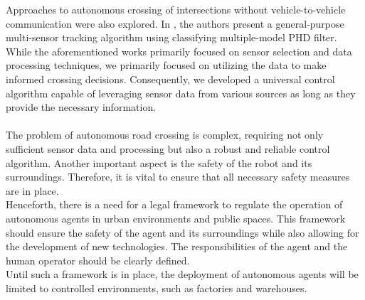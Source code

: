 Approaches to autonomous crossing of intersections without vehicle-to-vehicle communication were also explored. In \cite{CMMPHD}, the authors present a general-purpose multi-sensor tracking algorithm using classifying multiple-model PHD filter.\\
While the aforementioned works primarily focused on sensor selection and data processing techniques, we primarily focused on utilizing the data to make informed crossing decisions. Consequently, we developed a universal control algorithm capable of leveraging sensor data from various sources as long as they provide the necessary information.\\\\
The problem of autonomous road crossing is complex, requiring not only sufficient sensor data and processing but also a robust and reliable control algorithm. Another important aspect is the safety of the robot and its surroundings. Therefore, it is vital to ensure that all necessary safety measures are in place.\\
Henceforth, there is a need for a legal framework to regulate the operation of autonomous agents in urban environments and public spaces. This framework should ensure the safety of the agent and its surroundings while also allowing for the development of new technologies. The responsibilities of the agent and the human operator should be clearly defined.\\
Until such a framework is in place, the deployment of autonomous agents will be limited to controlled environments, such as factories and warehouses.
